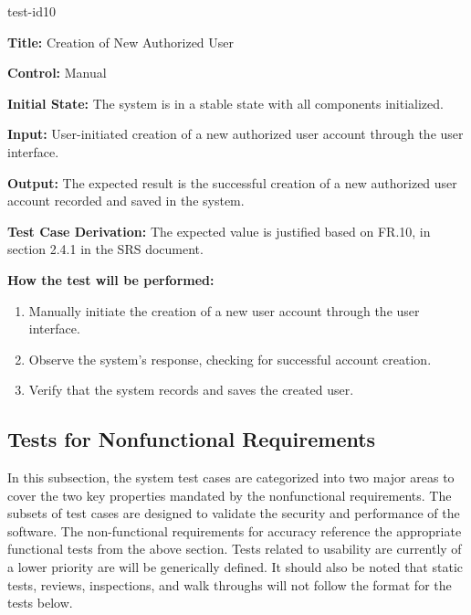 \documentclass[12pt, titlepage]{article}
\begin{document}
\begin{itemize}
    \begin{item}
        test-id10
        \begin{mdframed}[linewidth=0.5mm]
            \textbf{Title:} Creation of New Authorized User \par
            \textbf{Control:} Manual \par
            \textbf{Initial State:} The system is in a stable state with all components initialized. \par
            \textbf{Input:} User-initiated creation of a new authorized user account through the user interface. \par
            \textbf{Output:} The expected result is the successful creation of a new authorized user account recorded and saved in the system. \par
            \textbf{Test Case Derivation:} The expected value is justified based on FR.10, in section 2.4.1 in the SRS document. \par
            \textbf{How the test will be performed:}
            \begin{enumerate}[noitemsep]
                \item Manually initiate the creation of a new user account through the user interface.
                \item Observe the system's response, checking for successful account creation.
                \item Verify that the system records and saves the created user.
            \end{enumerate}
        \end{mdframed}
    \end{item}
\end{itemize}

\pagebreak
\subsection{Tests for Nonfunctional Requirements}
In this subsection, the system test cases are categorized into two major areas to cover the two key properties mandated by the nonfunctional requirements. The subsets of test cases are designed to validate the security and performance of the software. The non-functional requirements for accuracy reference the appropriate functional tests from the above section. Tests related to usability are currently of a lower priority are will be generically defined. It should also be noted that static tests, reviews, inspections, and walk throughs will not follow the format for the tests below.
\end{document}
